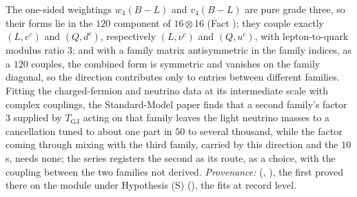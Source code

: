The one-sided weightings $w_{4}(B - L)$ and $v_{4}(B - L)$ are pure grade three, so their forms lie in the $120$ component of $16 \otimes 16$ (Fact ); they couple exactly $(L, e^{c})$ and $(Q, d^{c})$, respectively $(L, \nu^{c})$ and $(Q, u^{c})$, with lepton-to-quark modulus ratio $3$; and with a family matrix antisymmetric in the family indices, as a $120$ couples, the combined form is symmetric and vanishes on the family diagonal, so the direction contributes only to entries between different families. Fitting the charged-fermion and neutrino data at its intermediate scale with complex couplings, the Standard-Model paper finds that a second family's factor $3$ supplied by $T_{\mathrm{GJ}}$ acting on that family leaves the light neutrino masses to a cancellation tuned to about one part in $50$ to several thousand, while the factor coming through mixing with the third family, carried by this direction and the $10$s, needs none; the series registers the second as its route, as a choice, with the coupling between the two families not derived. \emph{Provenance:} \cite[Prop.~11.6, Obs.~11.7, Rem.~11.8]{ButlerT12} (, ), the first proved there on the module under Hypothesis (S) (), the fits at record level.
